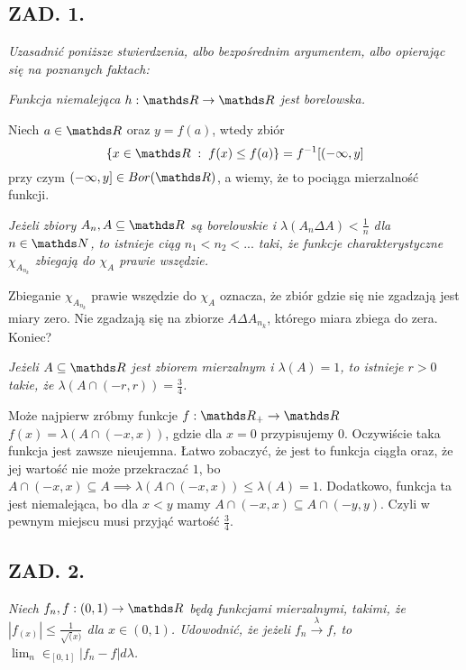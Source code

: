 \documentclass{article}
\begin{document}
\subsection*{ZAD. 1.}
\emph{Uzasadnić poniższe stwierdzenia, albo bezpośrednim argumentem, albo opierając się na poznanych faktach:}
\medskip

\emph{\color{def}Funkcja niemalejąca $h:\R\to\R$ jest borelowska.}
\smallskip

Niech $a\in \R$ oraz $y=f(a)$, wtedy zbiór
$$\{x\in\R\;:\;f(x)\leq f(a)\}=f^{-1}[(-\infty,y]$$
przy czym $(-\infty,y]\in Bor(\R)$, a wiemy, że to pociąga mierzalność funkcji.
\medskip

\emph{\color{def}Jeżeli zbiory $A_n,A\subseteq \R$ są borelowskie i $\lambda(A_n\Delta A)<\frac1n$ dla $n\in\N$, to istnieje ciąg $n_1<n_2<...$ taki, że funkcje charakterystyczne $\chi_{A_{n_k}}$ zbiegają do $\chi_A$ prawie wszędzie.}
\medskip

Zbieganie $\chi_{A_{n_k}}$ prawie wszędzie do $\chi_A$ oznacza, że zbiór gdzie się nie zgadzają jest miary zero. Nie zgadzają się na zbiorze $A\Delta A_{n_k}$, którego miara zbiega do zera. Koniec?
\medskip

\emph{\color{def}Jeżeli $A\subseteq\R$ jest zbiorem mierzalnym i $\lambda(A)=1$, to istnieje $r>0$ takie, że $\lambda(A\cap(-r,r))=\frac34$.}
\medskip

Może najpierw zróbmy funkcje $f:\R_+\to\R$ $f(x)=\lambda(A\cap(-x,x))$, gdzie dla $x=0$ przypisujemy $0$. Oczywiście taka funkcja jest zawsze nieujemna. Łatwo zobaczyć, że jest to funkcja ciągła oraz, że jej wartość nie może przekraczać $1$, bo $A\cap(-x,x)\subseteq A\implies \lambda(A\cap(-x,x))\leq\lambda(A)=1$. Dodatkowo, funkcja ta jest niemalejąca, bo dla $x<y$ mamy $A\cap(-x,x)\subseteq A\cap(-y,y)$. Czyli w pewnym miejscu musi przyjąć wartość $\frac34$.

\subsection*{ZAD. 2.}
\emph{Niech $f_n,f:(0,1)\to\R$ będą funkcjami mierzalnymi, takimi, że $|f_(x)|\leq\frac1{\sqrt(x)}$ dla $x\in(0,1)$. Udowodnić, że jeżeli $f_n\xrightarrow[]{\lambda}f$, to $\lim_n\in_{[0,1]}|f_n-f|d\lambda$.}
\medskip
\end{document}
